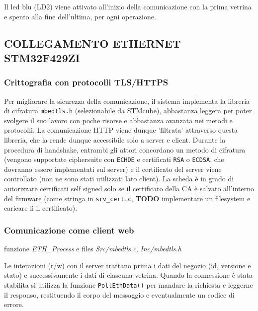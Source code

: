 Il led blu (LD2) viene attivato all'inizio della comunicazione con la prima vetrina e spento alla fine dell'ultima, per ogni operazione.

\subsection{COLLEGAMENTO ETHERNET STM32F429ZI}

\subsubsection{Crittografia con protocolli TLS/HTTPS}

Per migliorare la sicurezza della comunicazione, il sistema implementa la libreria di cifratura \texttt{mbedtls.h} (selezionabile da STMcube), abbastanza leggera per poter svolgere il suo lavoro con poche risorse e abbastanza avanzata nei metodi e protocolli. La comunicazione HTTP viene dunque 'filtrata' attraverso questa libreria, che la rende dunque accessibile solo a server e client. Durante la procedura di handshake, entrambi gli attori concordano un metodo di cifratura (vengono supportate ciphersuite con \texttt{ECHDE} e certificati \texttt{RSA} o \texttt{ECDSA}, che dovranno essere implementati sul server) e il certificato del server viene controllato (non ne sono stati utilizzati lato client). La scheda \`{e} in grado di autorizzare certificati self signed solo se il certificato della CA \`{e} salvato all'interno del firmware (come stringa in \texttt{srv\_cert.c}, \textbf{TODO} implementare un filesystem e caricare l\`{i} il certificato).

\subsubsection{Comunicazione come client web}

\textsf{funzione \textit{ETH\_Process} e files \textit{Src/mbedtls.c}, \textit{Inc/mbedtls.h}}

Le interazioni (r/w) con il server trattano prima i dati del negozio (id, versione e stato) e successivamente i dati di ciascuna vetrina. Quando la connessione \`{e} stata stabilita si utilizza la funzione \texttt{PollEthData()} per mandare la richiesta e leggerne il responso, restituendo il corpo del messaggio e eventualmente un codice di errore. 

